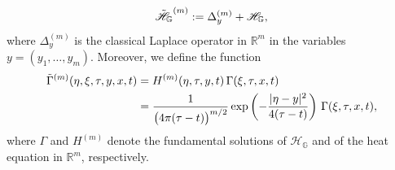 \documentclass[11pt,a4paper]{article}
\numberwithin{equation}{section}
\newcommand{\R}{\mathbb{R}}
\def \GG {{\mathbb{G}}}
\def \H {\mathscr{H}_\GG}
\def \t {{\tau}}
\def \x {{\xi}}
\def \y {{\eta}}
\begin{document}
{\vspace{-0.1cm}
\begin{equation}\label{Eq:oper-ltilde}
	\tilde{\H}^{(m)}:= \Delta_y^{(m)}+ \H ,
	\vspace{-0.1cm}
\end{equation}
where $\Delta_y^{(m)}$ is the classical Laplace operator in $\R^m$ in the variables $y=(y_1,\ldots,y_m)$. Moreover, we define the function
\begin{equation}\label{Eq:Gammatilde}
	\begin{aligned}
		\tilde{\Gamma}^{(m)}(\y,\x,\t,y,x,t)&=H^{(m)}(\y,\t,y,t)\,\Gamma(\x,\t,x,t)\\
		&=\frac{1}{\big(4\pi(\t-t)\big)^{m/2}}\exp \left(-\frac{|\y-y|^2}{4(\t-t)} \right)\,\Gamma(\x,\t,x,t),
	\end{aligned}
	\vspace{-0.1cm}
\end{equation}
where $\Gamma$ and $H^{(m)}$ denote the fundamental solutions of $\H$ and of the heat equation in $\R^m$, respectively.
	
}
\end{document}

